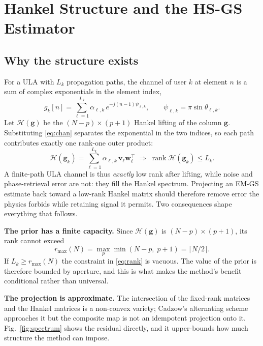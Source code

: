 \documentclass[conference]{IEEEtran}
\DeclareMathOperator{\rank}{rank}
\newcommand{\rmax}{r_{\max}}
\newcommand{\bg}{\mathbf{g}}
\newcommand{\Hank}{\mathcal{H}}
\begin{document}
\section{Hankel Structure and the HS-GS Estimator}

\subsection{Why the structure exists}

For a ULA with $L_k$ propagation paths, the channel of user $k$ at element $n$
is a sum of complex exponentials in the element index,
\begin{equation}\label{eq:chan}
g_k[n] = \sum_{\ell=1}^{L_k}\alpha_{\ell,k}\,
e^{-j(n-1)\psi_{\ell,k}},\qquad \psi_{\ell,k}=\pi\sin\theta_{\ell,k}.
\end{equation}
Let $\Hank(\bg)$ be the $(N-p)\times(p+1)$ Hankel lifting of the column $\bg$.
Substituting \eqref{eq:chan} separates the exponential in the two indices, so
each path contributes exactly one rank-one outer product:
\begin{equation}\label{eq:rank}
\Hank(\bg_k)=\sum_{\ell=1}^{L_k}\alpha_{\ell,k}\,
\mathbf{v}_\ell\mathbf{w}_\ell^{\!\top}
\;\Longrightarrow\;
\rank\Hank(\bg_k)\le L_k .
\end{equation}
A finite-path ULA channel is thus \emph{exactly} low rank after lifting, while
noise and phase-retrieval error are not: they fill the Hankel spectrum.
Projecting an EM-GS estimate back toward a low-rank Hankel matrix should
therefore remove error the physics forbids while retaining signal it permits.
Two consequences shape everything that follows.

\textbf{The prior has a finite capacity.} Since $\Hank(\bg)$ is
$(N-p)\times(p+1)$, its rank cannot exceed
\begin{equation}\label{eq:cap}
\rmax(N)=\max_p \min(N-p,\;p+1)=\lceil N/2\rceil .
\end{equation}
If $L_k\ge\rmax(N)$ the constraint in \eqref{eq:rank} is vacuous. The value of
the prior is therefore bounded by aperture, and this is what makes the method's
benefit conditional rather than universal.

\textbf{The projection is approximate.} The intersection of the fixed-rank
matrices and the Hankel matrices is a non-convex variety; Cadzow's alternating
scheme \cite{cadzow1988} approaches it but the composite map is not an
idempotent projection onto it. Fig.~\ref{fig:spectrum} shows the residual
directly, and it upper-bounds how much structure the method can impose.
\end{document}

